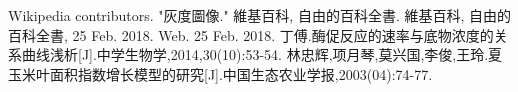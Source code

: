 \documentclass[withoutpreface,bwprint]{cumcmthesis}
\begin{document}
\begin{titlepage}
\centering
\end{titlepage}

\maketitle












\begin{thebibliography}{9}%
     Wikipedia contributors. "灰度圖像." 維基百科, 自由的百科全書. 維基百科, 自由的百科全書, 25 Feb. 2018. Web. 25 Feb. 2018.    
     丁傅.酶促反应的速率与底物浓度的关系曲线浅析[J].中学生物学,2014,30(10):53-54.
     林忠辉,项月琴,莫兴国,李俊,王玲.夏玉米叶面积指数增长模型的研究[J].中国生态农业学报,2003(04):74-77.
   \end{thebibliography}
\end{document}
